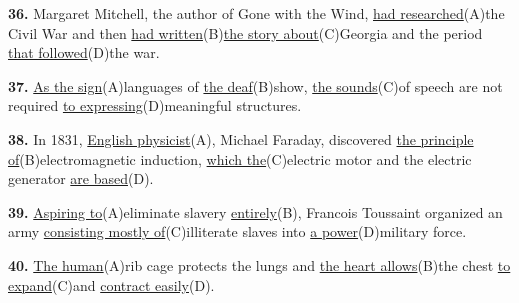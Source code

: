 \documentclass[12pt]{article}
\begin{document}
\par
\vspace{\questionblockgap}
\noindent\textbf{36.} Margaret Mitchell, the author of Gone with the Wind, \uline{had researched}(A)the Civil War and then \uline{had written}(B)\uline{the story about}(C)Georgia and the period \uline{that followed}(D)the war.
\par
\vspace{\questionblockgap}
\noindent\textbf{37.} \uline{As the sign}(A)languages of \uline{the deaf}(B)show, \uline{the sounds}(C)of speech are not required \uline{to expressing}(D)meaningful structures.
\par
\vspace{\questionblockgap}
\noindent\textbf{38.} In 1831, \uline{English physicist}(A), Michael Faraday, discovered \uline{the principle of}(B)electromagnetic induction, \uline{which the}(C)electric motor and the electric generator \uline{are based}(D).
\par
\vspace{\questionblockgap}
\noindent\textbf{39.} \uline{Aspiring to}(A)eliminate slavery \uline{entirely}(B), Francois Toussaint organized an army \uline{consisting mostly of}(C)illiterate slaves into \uline{a power}(D)military force.
\par
\vspace{\questionblockgap}
\noindent\textbf{40.} \uline{The human}(A)rib cage protects the lungs and \uline{the heart allows}(B)the chest \uline{to expand}(C)and \uline{contract easily}(D).
\par
\vspace{\questionblockgap}
\end{document}
